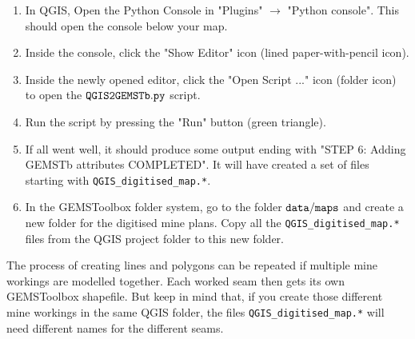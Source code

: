 \begin{enumerate}
    If you want a fixed depth of your mine plan, set the parameter to the right value, e.g. 100 m depth:
    \begin{verbatim}
       height = -100.
    \end{verbatim}
    Note that a negative value of ${\tt height}$ represents the depth of the mine workings. If you have created a variable depth layer in Section \ref{sec:digitising_depth}, enter that for the variable ${\tt z\_layer\_file}$, e.g.:
    \begin{verbatim}
       z_layer_file = "slope_raster_IDW.tif"
    \end{verbatim}
    As for the other file names, if the file name is empty or the file does not exist, then the script will assume that no variable depth is required, and the value of the parameter ${\tt height}$ will be used instead.
    
    Save the changes when ready.
    \item In QGIS, Open the Python Console in "Plugins" $\rightarrow$ "Python console". This should open the console below your map.
    \item Inside the console, click the "Show Editor" icon (lined paper-with-pencil icon). 
    \item Inside the newly opened editor, click the "Open Script ..." icon (folder icon) to open the ${\tt QGIS2GEMSTb.py}$ script.
    \item Run the script by pressing the "Run" button (green triangle).
    \item If all went well, it should produce some output ending with "STEP 6: Adding GEMSTb attributes COMPLETED". It will have created a set of files starting with \verb|QGIS_digitised_map.*|. 
    \item In the GEMSToolbox folder system, go to the folder ${\tt data/maps}$ and create a new folder for the digitised mine plans. Copy all the \verb|QGIS_digitised_map.*| files from the QGIS project folder to this new folder.
\end{enumerate}
The process of creating lines and polygons can be repeated if multiple mine workings are modelled together. Each worked seam then gets its own GEMSToolbox shapefile. But keep in mind that, if you create those different mine workings in the same QGIS folder, the files \verb|QGIS_digitised_map.*| will need different names for the different seams. 

\vspace{0.5cm}
\noindent{}
\vspace{0.5cm}

